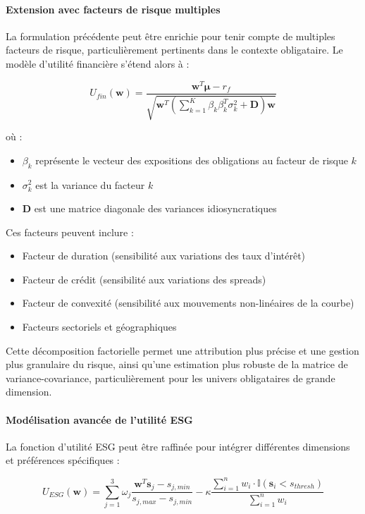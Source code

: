 \paragraph{Extension avec facteurs de risque multiples}
La formulation précédente peut être enrichie pour tenir compte de multiples facteurs de risque, particulièrement pertinents dans le contexte obligataire. Le modèle d'utilité financière s'étend alors à :

\begin{equation}
U_{fin}(\mathbf{w}) = \frac{\mathbf{w}^T \boldsymbol{\mu} - r_f}{\sqrt{\mathbf{w}^T \left(\sum_{k=1}^{K} \beta_k \beta_k^T \sigma_k^2 + \mathbf{D}\right) \mathbf{w}}}
\end{equation}

où :
\begin{itemize}
    \item $\beta_k$ représente le vecteur des expositions des obligations au facteur de risque $k$
    \item $\sigma_k^2$ est la variance du facteur $k$
    \item $\mathbf{D}$ est une matrice diagonale des variances idiosyncratiques
\end{itemize}

Ces facteurs peuvent inclure :
\begin{itemize}
    \item Facteur de duration (sensibilité aux variations des taux d'intérêt)
    \item Facteur de crédit (sensibilité aux variations des spreads)
    \item Facteur de convexité (sensibilité aux mouvements non-linéaires de la courbe)
    \item Facteurs sectoriels et géographiques
\end{itemize}

Cette décomposition factorielle permet une attribution plus précise et une gestion plus granulaire du risque, ainsi qu'une estimation plus robuste de la matrice de variance-covariance, particulièrement pour les univers obligataires de grande dimension.

\paragraph{Modélisation avancée de l'utilité ESG}
La fonction d'utilité ESG peut être raffinée pour intégrer différentes dimensions et préférences spécifiques :

\begin{equation}
U_{ESG}(\mathbf{w}) = \sum_{j=1}^{3} \omega_j \frac{\mathbf{w}^T \mathbf{s}_{j} - s_{j,min}}{s_{j,max} - s_{j,min}} - \kappa \frac{\sum_{i=1}^{n} w_i \cdot \mathbb{I}(\mathbf{s}_{i} < s_{thresh})}{\sum_{i=1}^{n} w_i}
\end{equation}

